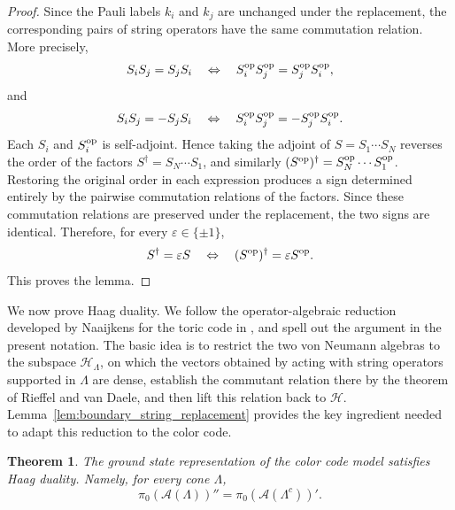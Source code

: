 \documentclass[a4paper,11pt]{article}
\newtheorem{theorem}{Theorem}[section]
\theoremstyle{definition}
\theoremstyle{remark}
\theoremstyle{remark}
\begin{document}
\begin{proof}
    Since the Pauli labels $k_i$ and $k_j$ are unchanged under the replacement, the corresponding pairs of string operators have the same commutation relation. More precisely,
    \[
        S_iS_j=S_jS_i \quad\Leftrightarrow\quad S_i^{\rm op}S_j^{\rm op} = S_j^{\rm op}S_i^{\rm op},
    \]
    and
    \[
        S_iS_j=-S_jS_i \quad\Leftrightarrow\quad S_i^{\rm op}S_j^{\rm op} = -S_j^{\rm op}S_i^{\rm op}.
    \] 
    Each $S_i$ and $S_i^{\rm op}$ is self-adjoint. Hence taking the adjoint of $S=S_1\cdots S_N$ reverses the order of the factors $S^\dagger=S_N\cdots S_1$, and similarly $(S^{\rm op})^\dagger = S_N^{\rm op}\cdots S_1^{\rm op}$. Restoring the original order in each expression produces a sign determined entirely by the pairwise commutation relations of the factors. Since these commutation relations are preserved under the replacement, the two signs are identical. Therefore, for every
    $\varepsilon\in\{\pm1\}$,
    \[
        S^\dagger=\varepsilon S \quad\Leftrightarrow\quad (S^{\rm op})^\dagger = \varepsilon S^{\rm op}.
    \]
    This proves the lemma.
\end{proof}

We now prove Haag duality. We follow the operator-algebraic reduction developed by Naaijkens for the toric code in \cite[Lemmas~3.5--3.8 and Theorem~3.1]{naaijkens2012haag}, and spell out the argument in the present notation. The basic idea is to restrict the two von Neumann algebras to the subspace $\mathcal H_\Lambda$, on which the vectors obtained by acting with string operators supported in $\Lambda$ are dense, establish the commutant relation there by the theorem of Rieffel and van Daele, and then lift this relation back to $\mathcal H$. Lemma~\ref{lem:boundary_string_replacement} provides the key ingredient needed to adapt this reduction to the color code.

\begin{theorem}\label{thm:haag_duality}
The ground state representation of the color code model satisfies Haag duality. Namely, for every cone $\Lambda$,
\[
    \pi_0(\mathcal A(\Lambda))''=\pi_0(\mathcal A(\Lambda^c))'.
\]
\end{theorem}
\end{document}

